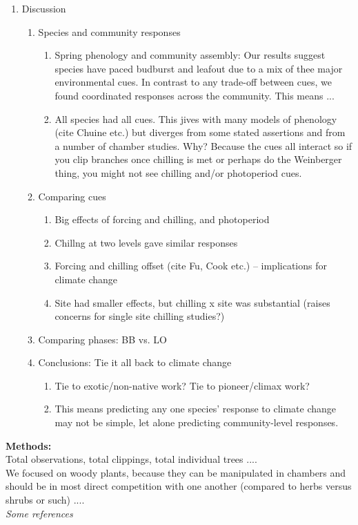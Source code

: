 \documentclass[11pt,a4paper]{article}
\begin{document}
\begin{enumerate}
\item Discussion
\begin{enumerate}
\item Species and community responses
\begin{enumerate}
\item Spring phenology and community assembly: Our results suggest species have paced budburst and leafout due to a mix of thee major environmental cues. In contrast to any trade-off between cues, we found coordinated responses across the community. This means ...
\item All species had all cues. This jives with many models of phenology (cite Chuine etc.) but diverges from some stated assertions and from a number of chamber studies. Why? Because the cues all interact so if you clip branches once chilling is met or perhaps do the Weinberger thing, you might not see chilling and/or photoperiod cues.
\end{enumerate}
\item Comparing cues
\begin{enumerate}
\item Big effects of forcing and chilling, and photoperiod
\item Chillng at two levels gave similar responses
\item Forcing and chilling offset (cite Fu, Cook etc.) -- implications for climate change 
\item Site had smaller effects, but chilling x site was substantial (raises concerns for single site chilling studies?)
\end{enumerate}
\item Comparing phases: BB vs. LO
\item Conclusions: Tie it all back to climate change
\begin{enumerate}
\item Tie to exotic/non-native work? Tie to pioneer/climax work? 
\item This means predicting any one species' response to climate change may not be simple, let alone predicting community-level responses. 
\end{enumerate}
\end{enumerate}

\end{enumerate}



{\bf Methods:}\\
Total observations, total clippings, total individual trees .... \\
We focused on woody plants, because they can be manipulated in chambers and should be in most direct competition with one another (compared to herbs versus shrubs or such) ....\\



\noindent \emph{Some references}\\

\begin{footnotesize}
{\def\section*#1{}

}
\end{footnotesize}
\end{document}
